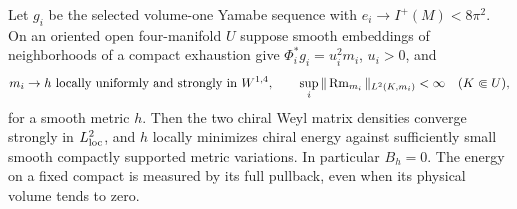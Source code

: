\begin{theorem}\label{thm:local-min}\label{prop:local-min}
Let \(g_i\) be the selected volume-one Yamabe sequence with
\(e_i\to I^+(M)<8\pi^2\). On an oriented open four-manifold \(U\)
suppose smooth embeddings of neighborhoods of a compact exhaustion
give \(\Phi_i^*g_i=u_i^2m_i\), \(u_i>0\), and
\[
 m_i\to h\text{ locally uniformly and strongly in }W^{1,4},
 \qquad \sup_i\|\operatorname{Rm}_{m_i}\|_{L^2(K,m_i)}<\infty
 \quad (K\Subset U),
\]
for a smooth metric \(h\). Then the two chiral Weyl matrix
densities converge strongly in \(L^2_{\rm loc}\), and \(h\)
locally minimizes chiral energy against sufficiently small smooth
compactly supported metric variations. In particular \(B_h=0\).
The energy on a fixed compact is measured by its full pullback,
even when its physical volume tends to zero.
\end{theorem}

